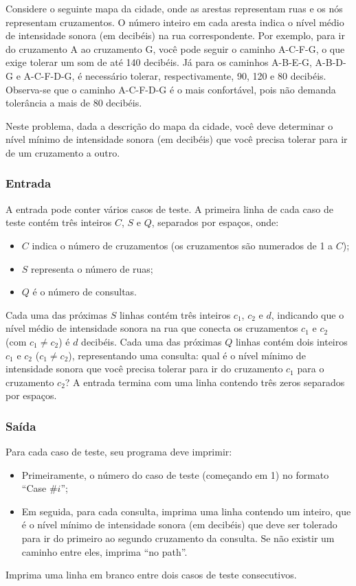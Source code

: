 Considere o seguinte mapa da cidade, onde as arestas representam ruas e os nós representam cruzamentos. O número inteiro em cada aresta indica o nível médio de intensidade sonora (em decibéis) na rua correspondente. Por exemplo, para ir do cruzamento A ao cruzamento G, você pode seguir o caminho A-C-F-G, o que exige tolerar um som de até 140 decibéis. Já para os caminhos A-B-E-G, A-B-D-G e A-C-F-D-G, é necessário tolerar, respectivamente, 90, 120 e 80 decibéis. Observa-se que o caminho A-C-F-D-G é o mais confortável, pois não demanda tolerância a mais de 80 decibéis.

Neste problema, dada a descrição do mapa da cidade, você deve determinar o nível mínimo de intensidade sonora (em decibéis) que você precisa tolerar para ir de um cruzamento a outro.

\subsubsection*{Entrada}
A entrada pode conter vários casos de teste. A primeira linha de cada caso de teste contém três inteiros \(C\), \(S\) e \(Q\), separados por espaços, onde:
\begin{itemize}
    \item \(C\) indica o número de cruzamentos (os cruzamentos são numerados de 1 a \(C\));
    \item \(S\) representa o número de ruas;
    \item \(Q\) é o número de consultas.
\end{itemize}
Cada uma das próximas \(S\) linhas contém três inteiros \(c_1\), \(c_2\) e \(d\), indicando que o nível médio de intensidade sonora na rua que conecta os cruzamentos \(c_1\) e \(c_2\) (com \(c_1 \neq c_2\)) é \(d\) decibéis.
Cada uma das próximas \(Q\) linhas contém dois inteiros \(c_1\) e \(c_2\) (\(c_1 \neq c_2\)), representando uma consulta: qual é o nível mínimo de intensidade sonora que você precisa tolerar para ir do cruzamento \(c_1\) para o cruzamento \(c_2\)?
A entrada termina com uma linha contendo três zeros separados por espaços.

\subsubsection*{Saída}
Para cada caso de teste, seu programa deve imprimir:
\begin{itemize}
    \item Primeiramente, o número do caso de teste (começando em 1) no formato “Case \#\(i\)”;
    \item Em seguida, para cada consulta, imprima uma linha contendo um inteiro, que é o nível mínimo de intensidade sonora (em decibéis) que deve ser tolerado para ir do primeiro ao segundo cruzamento da consulta. Se não existir um caminho entre eles, imprima “no path”.
\end{itemize}
Imprima uma linha em branco entre dois casos de teste consecutivos.

